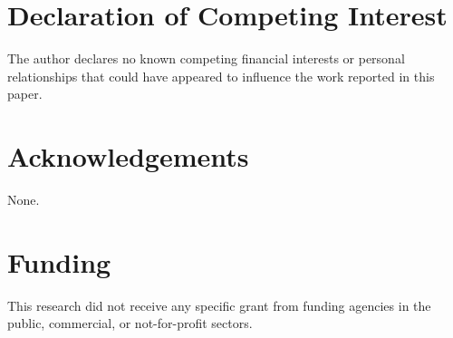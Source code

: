 \documentclass[11pt,a4paper]{article}
\begin{document}
\section*{Declaration of Competing Interest}
The author declares no known competing financial interests or personal
relationships that could have appeared to influence the work reported in this
paper.

\section*{Acknowledgements}
None.

\section*{Funding}
This research did not receive any specific grant from funding agencies in the
public, commercial, or not-for-profit sectors.
\end{document}
